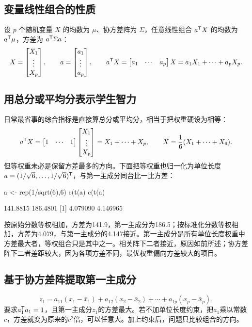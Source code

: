 \subsection{变量线性组合的性质}
设 $p$ 个随机变量 $X$ 的均数为 $\mu$、协方差阵为 $\Sigma$，任意线性组合 $a^{\mathsf T} X$ 的均数为 $a^{\mathsf T}\mu$，方差为 $a^{\mathsf T}\Sigma a$：
\[
X=\begin{bmatrix}X_1\\\vdots\\X_p\end{bmatrix},\qquad
 a=\begin{bmatrix}a_1\\\vdots\\a_p\end{bmatrix},\qquad
 a^{\mathsf T} X=\begin{bmatrix}a_1&\cdots&a_p\end{bmatrix}X
 =a_1X_1+\cdots+a_pX_p.
\]
\subsection{用总分或平均分表示学生智力}
日常最省事的综合指标是直接算总分或平均分，相当于把权重硬设为相等：
\[
a^{\mathsf T} X=\begin{bmatrix}1&\cdots&1\end{bmatrix}
\begin{bmatrix}X_1\\\vdots\\X_p\end{bmatrix}=X_1+\cdots+X_p,
\qquad
\bar X=\frac16(X_1+\cdots+X_6).
\]
但等权重未必是保留方差最多的方向。下面把等权重也归一化为单位长度 $a=(1/\sqrt6,\ldots,1/\sqrt6)^{\mathsf T}$，与第一主成分同台比一比方差：
\par\noindent\begin{rcode}
a <- rep(1/sqrt(6),6)
c(t(a)%
c(t(a)%
\end{rcode}
\begin{routput}
[1] 141.8815 186.4801
[1] 4.079090 4.146965
\end{routput}
按原始分数等权相加，方差为141.9，第一主成分为186.5；按标准化分数等权相加，方差为4.079，与第一主成分的4.147接近。第一主成分是所有单位长度权重中方差最大者，等权组合只是其中之一。相关阵下二者接近，原因如前所述；协方差阵下二者差距较大，因为各项方差不同，最优权重偏向方差较大的项目。
\subsection{基于协方差阵提取第一主成分}
\[
z_1=a_{11}(x_1-\bar x_1)+a_{12}(x_2-\bar x_2)+\cdots+a_{1p}(x_p-\bar x_p).
\]
要求$a_1^{\mathsf T} a_1=1$，且第一主成分$z_1$的方差最大。若不加单位长度约束，把$a_1$乘以常数$c$，方差就变为原来的$c^2$倍，可以任意大。加上约束后，问题只比较组合的方向。

